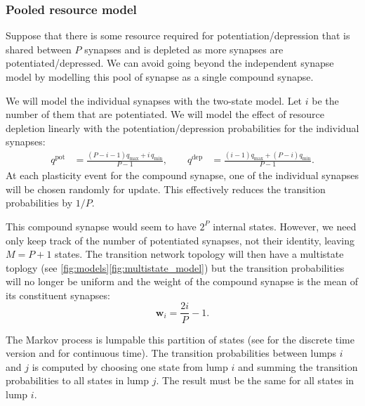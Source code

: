 \documentclass[12pt]{article}
\newcommand{\w}{\mathbf{w}}
\newcommand{\pot}{^{\text{pot}}}
\newcommand{\dep}{^{\text{dep}}}
\newcommand{\lmax}{_{\text{max}}}
\newcommand{\lmin}{_{\text{min}}}
\begin{document}
\subsubsection{Pooled resource model}\label{sec:pooledmodel}

Suppose that there is some resource required for potentiation/depression that is shared between $P$ synapses and is depleted as more synapses are potentiated/depressed.
We can avoid going beyond the independent synapse model by modelling this pool of synapse as a single compound synapse.

We will model the individual synapses with the two-state model.
Let $i$ be the number of them that are potentiated.
We will model the effect of resource depletion linearly with the potentiation/depression probabilities for the individual synapses:
%
\begin{equation}\label{eq:depletion}
  \begin{aligned}
    q\pot &= \frac{(P-i-1)q\lmax + i\,q\lmin}{P-1}, \qquad
    q\dep &= \frac{(i-1)q\lmax + (P-i)q\lmin}{P-1}.
  \end{aligned}
\end{equation}
%
At each plasticity event for the compound synapse, one of the individual synapses will be chosen randomly for update.
This effectively reduces the transition probabilities by $1/P$.

This compound synapse would seem to have $2^P$ internal states.
However, we need only keep track of the number of potentiated synapses, not their identity, leaving $M=P+1$ states.
The transition network topology will then have a multistate toplogy (see \autoref{fig:models}\ref{fig:multistate_model}) but the transition probabilities will no longer be uniform and the weight of the compound synapse is the mean of its constituent synapses:
%
\begin{equation}\label{eq:pooledweight}
  \w_i = \frac{2i}{P}-1.
\end{equation}
%


The Markov process is lumpable \wrt this partition of states (see \cite[\S6.3]{kemeny1960finite} for the discrete time version and \cite{burke1958markovian,Ball1993Lumpability} for continuous time).
The transition probabilities between lumps $i$ and $j$ is computed by choosing one state from lump $i$ and summing the transition probabilities to all states in lump $j$.
The result must be the same for all states in lump $i$.
\end{document}

